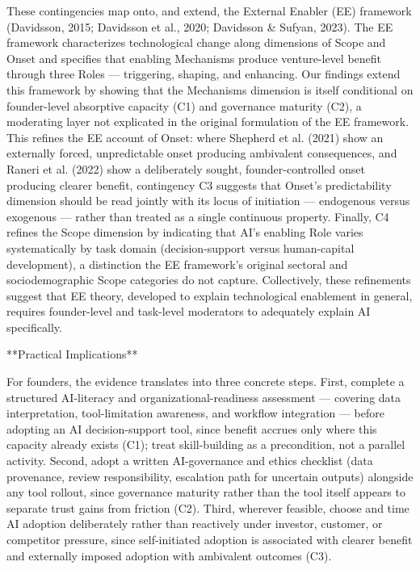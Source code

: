\documentclass[11pt, a4paper]{article}
\begin{document}
These contingencies map onto, and extend, the External Enabler (EE) framework (Davidsson, 2015; Davidsson et al., 2020; Davidsson & Sufyan, 2023). The EE framework characterizes technological change along dimensions of Scope and Onset and specifies that enabling Mechanisms produce venture-level benefit through three Roles — triggering, shaping, and enhancing. Our findings extend this framework by showing that the Mechanisms dimension is itself conditional on founder-level absorptive capacity (C1) and governance maturity (C2), a moderating layer not explicated in the original formulation of the EE framework. This refines the EE account of Onset: where Shepherd et al. (2021) show an externally forced, unpredictable onset producing ambivalent consequences, and Raneri et al. (2022) show a deliberately sought, founder-controlled onset producing clearer benefit, contingency C3 suggests that Onset's predictability dimension should be read jointly with its locus of initiation — endogenous versus exogenous — rather than treated as a single continuous property. Finally, C4 refines the Scope dimension by indicating that AI's enabling Role varies systematically by task domain (decision-support versus human-capital development), a distinction the EE framework's original sectoral and sociodemographic Scope categories do not capture. Collectively, these refinements suggest that EE theory, developed to explain technological enablement in general, requires founder-level and task-level moderators to adequately explain AI specifically.

**Practical Implications**

For founders, the evidence translates into three concrete steps. First, complete a structured AI-literacy and organizational-readiness assessment — covering data interpretation, tool-limitation awareness, and workflow integration — before adopting an AI decision-support tool, since benefit accrues only where this capacity already exists (C1); treat skill-building as a precondition, not a parallel activity. Second, adopt a written AI-governance and ethics checklist (data provenance, review responsibility, escalation path for uncertain outputs) alongside any tool rollout, since governance maturity rather than the tool itself appears to separate trust gains from friction (C2). Third, wherever feasible, choose and time AI adoption deliberately rather than reactively under investor, customer, or competitor pressure, since self-initiated adoption is associated with clearer benefit and externally imposed adoption with ambivalent outcomes (C3).
\end{document}
